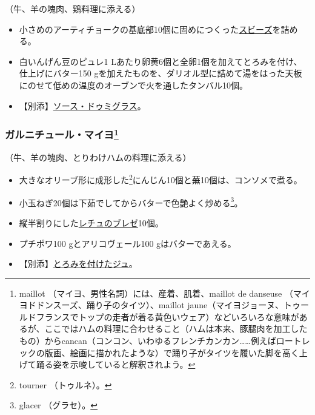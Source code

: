 \begin{recette}


（牛、羊の塊肉、鶏料理に添える）

\begin{itemize}
\item
  小さめのアーティチョークの基底部10個に固めにつくった\protect\hyperlink{sauce-soubise}{スビーズ}を詰める。
\item
  白いんげん豆のピュレ1
  Lあたり卵黄6個と全卵1個を加えてとろみを付け、仕上げにバター150
  gを加えたものを、ダリオル型に詰めて湯をはった天板にのせて低めの温度のオーブンで火を通したタンバル10個。
\item
  【別添】\protect\hyperlink{sauce-demi-glace}{ソース・ドゥミグラス}。
\end{itemize}

\atoaki{}

\hypertarget{garniture-a-la-maillot}{%
\subsubsection[ガルニチュール・マイヨ]{\texorpdfstring{ガルニチュール・マイヨ\footnote{maillot
  （マイヨ、男性名詞）には、産着、肌着、maillot de danseuse
  （マイヨドドンスーズ、踊り子のタイツ）、maillot
  jaune（マイヨジョーヌ、トゥールドフランスでトップの走者が着る黄色いウェア）などいろいろな意味があるが、ここではハムの料理に合わせること（ハムは本来、豚腿肉を加工したもの）からcancan（コンコン、いわゆるフレンチカンカン\ldots{}\ldots{}例えばロートレックの版画、絵画に描かれたような）で踊り子がタイツを履いた脚を高く上げて踊る姿を示唆していると解釈されよう。}}{ガルニチュール・マイヨ}}\label{garniture-a-la-maillot}}



（牛、羊の塊肉、とりわけハムの料理に添える）

\begin{itemize}
\item
  大きなオリーブ形に成形した\footnote{tourner （トゥルネ）。}にんじん10個と蕪10個は、コンソメで煮る。
\item
  小玉ねぎ20個は下茹でしてからバターで色艶よく炒める\footnote{glacer
    （グラセ）。}。
\item
  縦半割りにした\protect\hyperlink{laitues-braisees-au-jus}{レチュのブレゼ}10個。
\item
  プチポワ100 gとアリコヴェール100 gはバターであえる。
\item
  【別添】\protect\hyperlink{jus-de-veau-lie}{とろみを付けたジュ}。
\end{itemize}


\end{recette}

